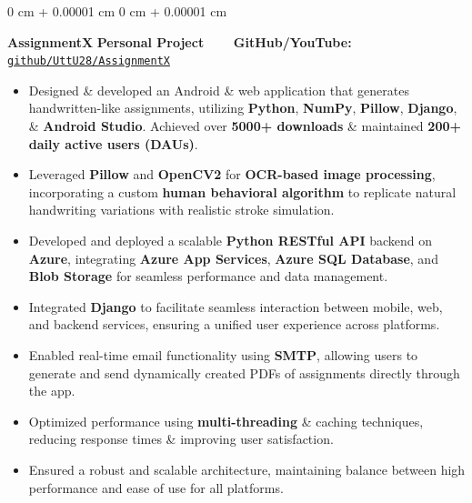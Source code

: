 \documentclass[10pt, letterpaper]{article}
\newenvironment{highlights}{
    \begin{itemize}[
        topsep=0.10 cm,
        parsep=0.10 cm,
        partopsep=0pt,
        itemsep=0pt,
        leftmargin=0 cm + 10pt
    ]
}{
    \end{itemize}
} %
\newenvironment{onecolentry}{
    \begin{adjustwidth}{
        0 cm + 0.00001 cm
    }{
        0 cm + 0.00001 cm
    }
}{
    \end{adjustwidth}
} %
\begin{document}
\begin{onecolentry}
	\textbf{AssignmentX} \hfill \textbf{Personal Project} \ \ \ \ \textbf{GitHub/YouTube:} \href{https://github.com/UttU28/AssignmentX}{\texttt{github/UttU28/AssignmentX}}
	\begin{highlights}
		\item Designed \& developed an Android \& web application that generates handwritten-like assignments, utilizing \textbf{Python}, \textbf{NumPy}, \textbf{Pillow}, \textbf{Django}, \& \textbf{Android Studio}. Achieved over \textbf{5000+ downloads} \& maintained \textbf{200+ daily active users (DAUs)}.
		\item Leveraged \textbf{Pillow} and \textbf{OpenCV2} for \textbf{OCR-based image processing}, incorporating a custom \textbf{human behavioral algorithm} to replicate natural handwriting variations with realistic stroke simulation.
		\item Developed and deployed a scalable \textbf{Python RESTful API} backend on \textbf{Azure}, integrating \textbf{Azure App Services}, \textbf{Azure SQL Database}, and \textbf{Blob Storage} for seamless performance and data management.
		\item Integrated \textbf{Django} to facilitate seamless interaction between mobile, web, and backend services, ensuring a unified user experience across platforms.
		\item Enabled real-time email functionality using \textbf{SMTP}, allowing users to generate and send dynamically created PDFs of assignments directly through the app.
		\item Optimized performance using \textbf{multi-threading} \& caching techniques, reducing response times \& improving user satisfaction.
		\item Ensured a robust and scalable architecture, maintaining balance between high performance and ease of use for all platforms.
	\end{highlights}
\end{onecolentry}
\end{document}
